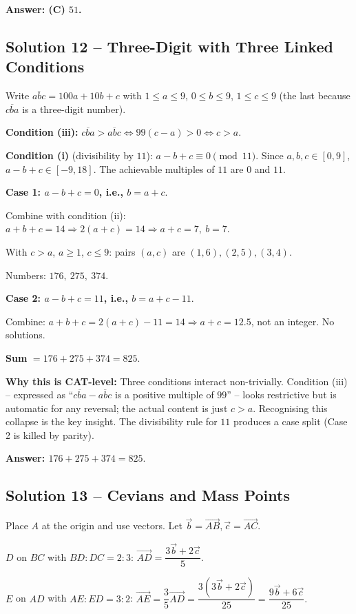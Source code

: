 \documentclass[11pt,a4paper]{article}
\begin{document}
\textbf{Answer: (C) $51$.}

\medskip

\subsection*{Solution 12 -- Three-Digit with Three Linked Conditions}
Write $\overline{abc}=100a+10b+c$ with $1\le a\le 9$, $0\le b\le 9$, $1\le c\le 9$ (the last because $\overline{cba}$ is a three-digit number).

\textbf{Condition (iii):} $\overline{cba}>\overline{abc} \Leftrightarrow 99(c-a)>0 \Leftrightarrow c>a.$

\textbf{Condition (i)} (divisibility by $11$): $a - b + c \equiv 0\pmod{11}.$ Since $a,b,c\in[0,9]$, $a-b+c\in[-9,18]$. The achievable multiples of $11$ are $0$ and $11.$

\textbf{Case 1: $a-b+c=0$, i.e., $b=a+c.$}

Combine with condition (ii): $a+b+c=14 \Rightarrow 2(a+c)=14 \Rightarrow a+c=7,\ b=7.$

With $c>a$, $a\ge 1$, $c\le 9$: pairs $(a,c)$ are $(1,6),(2,5),(3,4)$.

Numbers: $176,\ 275,\ 374.$

\textbf{Case 2: $a-b+c=11$, i.e., $b = a+c - 11.$}

Combine: $a+b+c = 2(a+c)-11 = 14 \Rightarrow a+c = 12.5$, not an integer. No solutions.

\textbf{Sum} $= 176+275+374 = 825.$

\textbf{Why this is CAT-level:} Three conditions interact non-trivially. Condition (iii) -- expressed as ``$\overline{cba}-\overline{abc}$ is a positive multiple of $99$'' -- looks restrictive but is automatic for any reversal; the actual content is just $c>a$. Recognising this collapse is the key insight. The divisibility rule for $11$ produces a case split (Case 2 is killed by parity).

\textbf{Answer: $176+275+374 = 825.$}

\medskip

\subsection*{Solution 13 -- Cevians and Mass Points}
Place $A$ at the origin and use vectors. Let $\vec b = \vec{AB}, \vec c = \vec{AC}.$

$D$ on $BC$ with $BD:DC=2:3$: $\vec{AD} = \dfrac{3\vec b + 2\vec c}{5}.$

$E$ on $AD$ with $AE:ED=3:2$: $\vec{AE} = \dfrac{3}{5}\vec{AD} = \dfrac{3(3\vec b + 2\vec c)}{25} = \dfrac{9\vec b + 6\vec c}{25}.$
\end{document}
